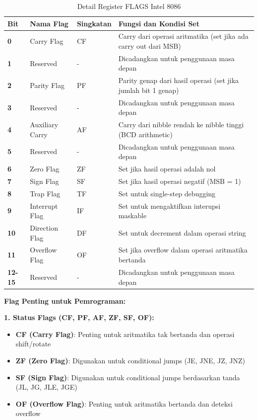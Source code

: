 \documentclass[../main.tex]{subfiles}
\begin{document}
\begin{table}[h]
\centering
\caption{Detail Register FLAGS Intel 8086}
\begin{tabular}{|p{2cm}|p{3cm}|p{2cm}|p{8cm}|}
\hline
\textbf{Bit} & \textbf{Nama Flag} & \textbf{Singkatan} & \textbf{Fungsi dan Kondisi Set} \\
\hline
\textbf{0} & Carry Flag & CF & Carry dari operasi aritmatika (set jika ada carry out dari MSB) \\
\hline
\textbf{1} & Reserved & - & Dicadangkan untuk penggunaan masa depan \\
\hline
\textbf{2} & Parity Flag & PF & Parity genap dari hasil operasi (set jika jumlah bit 1 genap) \\
\hline
\textbf{3} & Reserved & - & Dicadangkan untuk penggunaan masa depan \\
\hline
\textbf{4} & Auxiliary Carry & AF & Carry dari nibble rendah ke nibble tinggi (BCD arithmetic) \\
\hline
\textbf{5} & Reserved & - & Dicadangkan untuk penggunaan masa depan \\
\hline
\textbf{6} & Zero Flag & ZF & Set jika hasil operasi adalah nol \\
\hline
\textbf{7} & Sign Flag & SF & Set jika hasil operasi negatif (MSB = 1) \\
\hline
\textbf{8} & Trap Flag & TF & Set untuk single-step debugging \\
\hline
\textbf{9} & Interrupt Flag & IF & Set untuk mengaktifkan interupsi maskable \\
\hline
\textbf{10} & Direction Flag & DF & Set untuk decrement dalam operasi string \\
\hline
\textbf{11} & Overflow Flag & OF & Set jika overflow dalam operasi aritmatika bertanda \\
\hline
\textbf{12-15} & Reserved & - & Dicadangkan untuk penggunaan masa depan \\
\hline
\end{tabular}
\label{tab:flags-register-detail}
\end{table}

\textbf{Flag Penting untuk Pemrograman:}

\textbf{1. Status Flags (CF, PF, AF, ZF, SF, OF):}
\begin{itemize}
    \item \textbf{CF (Carry Flag)}: Penting untuk aritmatika tak bertanda dan operasi shift/rotate
    \item \textbf{ZF (Zero Flag)}: Digunakan untuk conditional jumps (JE, JNE, JZ, JNZ)
    \item \textbf{SF (Sign Flag)}: Digunakan untuk conditional jumps berdasarkan tanda (JL, JG, JLE, JGE)
    \item \textbf{OF (Overflow Flag)}: Penting untuk aritmatika bertanda dan deteksi overflow
\end{itemize}
\end{document}
